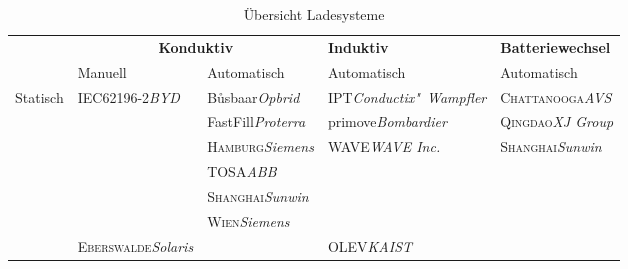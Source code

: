 \begin{table}\centering
	\begin{tabularx}{\linewidth}{lp{2.1cm}p{2.1cm}XX}
		\toprule
		                           &                       \multicolumn{2}{c}{\textbf{Konduktiv}}                       & \textbf{Induktiv}                     & \textbf{Batteriewechsel}                \\
		\cmidrule{2-3}             & Manuell                                   & Automatisch                            & Automatisch                           & Automatisch                             \\ \midrule
		\multirow{12}{*}{Statisch} & IEC62196-2\newline\emph{BYD}              & Bůsbaar\newline\emph{Opbrid}           & IPT\newline\emph{Conductix"~Wampfler} & \textsc{Chattanooga}\newline\emph{AVS}  \\
		                           &                                           & FastFill\newline\emph{Proterra}        & primove\newline\emph{Bombardier}      & \textsc{Qingdao}\newline\emph{XJ Group} \\
		                           &                                           & \textsc{Hamburg}\newline\emph{Siemens} & WAVE\newline\emph{WAVE Inc.}          & \textsc{Shanghai}\newline\emph{Sunwin}  \\
		                           &                                           & TOSA\newline\emph{ABB}                 &                                       &  \\
		                           &                                           & \textsc{Shanghai}\newline\emph{Sunwin} &                                       &  \\
		                           &                                           & \textsc{Wien}\newline\emph{Siemens}    &                                       &  \\ \midrule
		\multirow{2}{*}{Dynamisch} & \textsc{Eberswalde}\newline\emph{Solaris} &                                        & OLEV\newline\emph{KAIST}              &  \\ \bottomrule
	\end{tabularx}
	\caption{Übersicht Ladesysteme}
	\label{übersichtLadesysteme}
\end{table}

